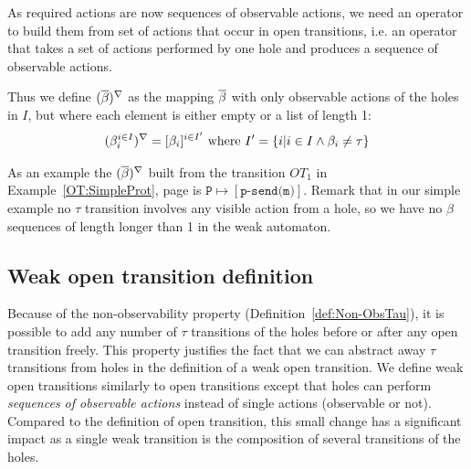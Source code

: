 \documentclass{lmcs}
\newcommand{\TODO}[1]{\textcolor{red}{\textbf{[TODO:#1]}}}
\newcommand{\RAB}[1]{\textcolor{magenta}{#1}}
\begin{document}
As required actions are now sequences of observable actions, we need an operator to build them from set of actions that occur in open transitions, i.e. an operator that takes a set of actions performed by one hole and produces a sequence of observable actions.

Thus we define $(\overline{\beta})^{\nabla}$ as the mapping $\overline{\beta}$  with only observable actions of the holes in $I$, but where each element is either empty or a list of length 1:
 \[(\beta_i^{i\in I})^{\nabla} = [\beta_i]^{i\in I'}\text{ where }I'=\left\{i| i\in I \land \beta_i\neq \tau\right\}\]

As an example the $(\overline{\beta})^{\nabla}$ built from the transition $OT_1$ in Example~\ref{OT:SimpleProt}, page \pageref{OT:SimpleProt} is $\texttt{P}\mapsto [\texttt{p-send(m)}]$. Remark that in our simple example no $\tau$ transition involves any visible action from a hole, so we have no $\beta$ sequences of length longer than 1 in the weak automaton.

\subsection{Weak open transition definition}

Because of the non-observability property (Definition~\ref{def:Non-ObsTau}), it is possible to add any number of $\tau$ transitions of the holes before or after any open transition freely. This property justifies the fact that we can abstract away $\tau$ transitions from holes in the definition of a weak open transition.
We define weak open transitions similarly to open transitions except that holes can perform \emph{sequences of observable actions} instead of single actions (observable or not). Compared to the definition of open transition, this small change has a significant impact as a single weak transition is the composition of several transitions of the holes.



%

\def\InvAct{\mathcal{Inv}}
%
\end{document}
